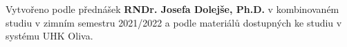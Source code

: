 \epigraph{Vytvořeno podle přednášek \textbf{RNDr. Josefa Dolejše, Ph.D.} v kombinovaném studiu v zimním semestru 2021/2022 a podle materiálů dostupných ke studiu v systému UHK Oliva.}{}